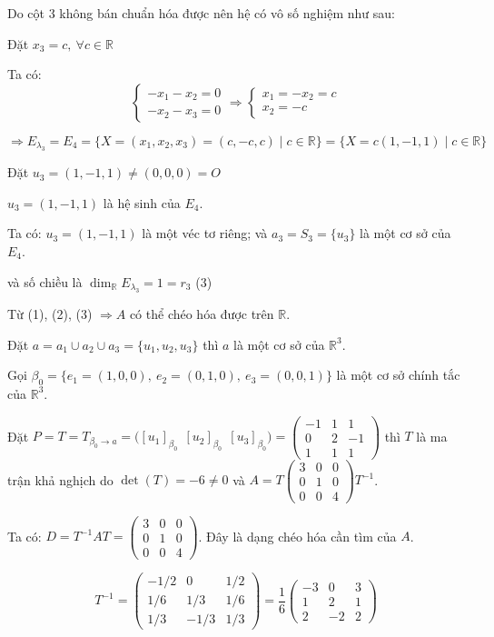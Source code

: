 \documentclass[12pt,a4paper]{article}
\newcommand{\R}{\mathbb{R}}
\begin{document}
Do cột 3 không bán chuẩn hóa được nên hệ có vô số nghiệm như sau:

Đặt $x_3=c,\ \forall c\in\R$

Ta có:
\[
\begin{cases}-x_1-x_2=0\\ -x_2-x_3=0\end{cases}
\Rightarrow
\begin{cases}x_1=-x_2=c\\ x_2=-c\end{cases}
\]

\[
\Rightarrow E_{\lambda_3}=E_4=\{X=(x_1,x_2,x_3)=(c,-c,c)\mid c\in\R\}=\{X=c(1,-1,1)\mid c\in\R\}
\]

Đặt $u_3=(1,-1,1)\neq(0,0,0)=O$

$u_3=(1,-1,1)$ là hệ sinh của $E_4$.

Ta có: $u_3=(1,-1,1)$ là một véc tơ riêng; và $a_3=S_3=\{u_3\}$ là một cơ sở của $E_4$.

và số chiều là $\dim_\R E_{\lambda_3}=1=r_3$ \hfill (3)

\medskip
Từ (1), (2), (3) $\Rightarrow A$ có thể chéo hóa được trên $\R$.

Đặt $a=a_1\cup a_2\cup a_3=\{u_1,u_2,u_3\}$ thì $a$ là một cơ sở của $\R^3$.

Gọi $\beta_0=\{e_1=(1,0,0),\ e_2=(0,1,0),\ e_3=(0,0,1)\}$ là một cơ sở chính tắc của $\R^3$.

Đặt $P=T=T_{\beta_0\to a}=\big([u_1]_{\beta_0}\ \ [u_2]_{\beta_0}\ \ [u_3]_{\beta_0}\big)=\begin{pmatrix}-1 & 1 & 1\\ 0 & 2 & -1\\ 1 & 1 & 1\end{pmatrix}$ thì $T$ là ma trận khả nghịch do $\det(T)=-6\neq 0$ và $A=T\begin{pmatrix}3&0&0\\0&1&0\\0&0&4\end{pmatrix}T^{-1}$.

Ta có: $D=T^{-1}AT=\begin{pmatrix}3&0&0\\0&1&0\\0&0&4\end{pmatrix}$. Đây là dạng chéo hóa cần tìm của $A$.

\[
T^{-1}=\begin{pmatrix}-1/2 & 0 & 1/2\\ 1/6 & 1/3 & 1/6\\ 1/3 & -1/3 & 1/3\end{pmatrix}
=\frac{1}{6}\begin{pmatrix}-3 & 0 & 3\\ 1 & 2 & 1\\ 2 & -2 & 2\end{pmatrix}
\]
\end{document}
